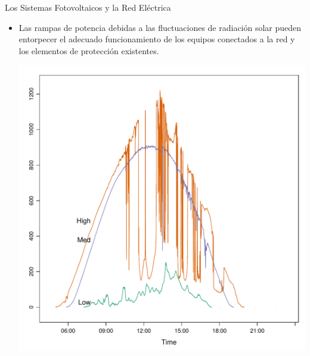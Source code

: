 \documentclass[aspectratio=169, usenames,svgnames,dvipsnames]{beamer}
\begin{document}
\begin{frame}[label={sec:orgf23690a}]{Los Sistemas Fotovoltaicos y la Red Eléctrica}
\begin{itemize}
\item Las rampas de potencia debidas a las fluctuaciones de radiación
solar pueden entorpecer el adecuado funcionamiento de los equipos
conectados a la red y los elementos de protección existentes.

\begin{center}
\includegraphics[height=0.75\textheight]{../figs/radLowMedHigh.pdf}
\end{center}
\end{itemize}
\end{frame}
\end{document}
